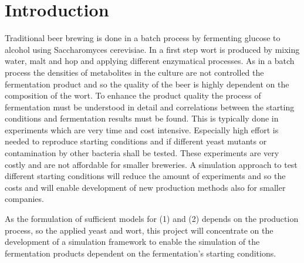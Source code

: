 \section{Introduction}\label{sec:introduction}

Traditional beer brewing is done in a batch process by fermenting glucose to alcohol using
Saccharomyces cerevisiae. In a first step wort is produced by mixing water, malt and hop and
applying different enzymatical processes. As in a batch process the densities of metabolites
in the culture are not controlled the fermentation product and so the quality of the beer is
highly dependent on the composition of the wort. To enhance the product quality the process
of fermentation must be understood in detail and correlations between the starting conditions
and fermentation results must be found. This is typically done in experiments which are very
time and cost intensive. Especially high effort is needed to reproduce starting conditions and if
different yeast mutants or contamination by other bacteria shall be tested. These experiments
are very costly and are not affordable for smaller breweries. A simulation approach to test
different starting conditions will reduce the amount of experiments and so the costs and will
enable development of new production methods also for smaller companies.

As the formulation of sufficient models for (1) and (2)
depends on the production process, so the applied yeast and wort, this project will concentrate
on the development of a simulation framework to enable the simulation of the fermentation
products dependent on the fermentation’s starting conditions.

